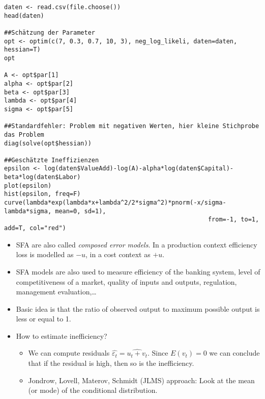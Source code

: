 \begin{Solution}{12.10}
\begin{enumerate}
\begin{verbatim}
daten <- read.csv(file.choose())
head(daten)

##Schätzung der Parameter
opt <- optim(c(7, 0.3, 0.7, 10, 3), neg_log_likeli, daten=daten, hessian=T)
opt

A <- opt$par[1]
alpha <- opt$par[2]
beta <- opt$par[3]
lambda <- opt$par[4]
sigma <- opt$par[5]

##Standardfehler: Problem mit negativen Werten, hier kleine Stichprobe das Problem
diag(solve(opt$hessian))

##Geschätzte Ineffizienzen
epsilon <- log(daten$ValueAdd)-log(A)-alpha*log(daten$Capital)-beta*log(daten$Labor)
plot(epsilon)
hist(epsilon, freq=F)
curve(lambda*exp(lambda*x+lambda^2/2*sigma^2)*pnorm(-x/sigma-lambda*sigma, mean=0, sd=1),
                                                        from=-1, to=1, add=T, col="red")
\end{verbatim}
\end{enumerate}

\begin{itemize}
  \item SFA are also called \emph{composed error models}. In a production context efficiency loss is modelled as $-u$, in a cost context as $+u$.
  \item SFA models are also used to measure efficiency of the banking system, level of competitiveness of a market, quality of inputs and outputs, regulation, management evaluation,\dots
  \item Basic idea is that the ratio of observed output to maximum possible output is less or equal to 1.
  \item How to estimate inefficiency?
  \begin{itemize}
    \item We can compute residuals $\hat{\varepsilon_t} = \widehat{u_t+v_t}$. Since $E(v_t)=0$ we can conclude that if the residual is high, then so is the inefficiency.
    \item Jondrow, Lovell, Materov, Schmidt (JLMS) approach: Look at the mean (or mode) of the conditional distribution.
  \end{itemize}
\end{itemize}
\end{Solution}
